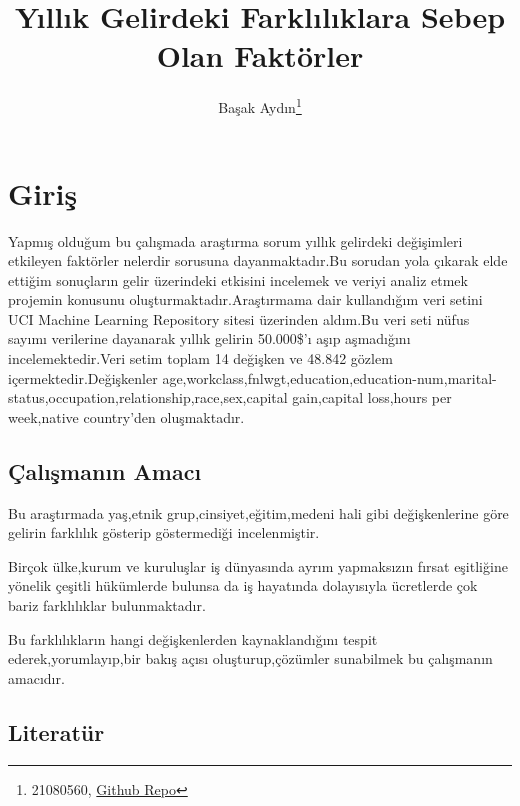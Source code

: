 \documentclass[
  12pt,
]{article}
\title{Yıllık Gelirdeki Farklılıklara Sebep Olan Faktörler}
\author{Başak Aydın\footnote{21080560, \href{https://github.com/basakaaydin/arasinavodevi}{Github Repo}}}
\date{}
\begin{document}
\maketitle

\hypertarget{giriux15f}{%
\section{Giriş}\label{giriux15f}}

Yapmış olduğum bu çalışmada araştırma sorum yıllık gelirdeki değişimleri etkileyen faktörler nelerdir sorusuna dayanmaktadır.Bu sorudan yola çıkarak elde ettiğim sonuçların gelir üzerindeki etkisini incelemek ve veriyi analiz etmek projemin konusunu oluşturmaktadır.Araştırmama dair kullandığım veri setini UCI Machine Learning Repository sitesi üzerinden aldım.Bu veri seti nüfus sayımı verilerine dayanarak yıllık gelirin 50.000\$'ı aşıp aşmadığını incelemektedir.Veri setim toplam 14 değişken ve 48.842 gözlem içermektedir.Değişkenler age,workclass,fnlwgt,education,education-num,marital-status,occupation,relationship,race,sex,capital gain,capital loss,hours per week,native country'den oluşmaktadır.

\hypertarget{uxe7alux131ux15fmanux131n-amacux131}{%
\subsection{Çalışmanın Amacı}\label{uxe7alux131ux15fmanux131n-amacux131}}

Bu araştırmada yaş,etnik grup,cinsiyet,eğitim,medeni hali gibi değişkenlerine göre gelirin farklılık gösterip göstermediği incelenmiştir.

Birçok ülke,kurum ve kuruluşlar iş dünyasında ayrım yapmaksızın fırsat eşitliğine yönelik çeşitli hükümlerde bulunsa da iş hayatında dolayısıyla ücretlerde çok bariz farklılıklar bulunmaktadır.

Bu farklılıkların hangi değişkenlerden kaynaklandığını tespit ederek,yorumlayıp,bir bakış açısı oluşturup,çözümler sunabilmek bu çalışmanın amacıdır.

\hypertarget{literatuxfcr}{%
\subsection{Literatür}\label{literatuxfcr}}
\end{document}
